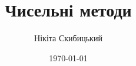 


\title{Чисельні методи}
\author{Нікіта Скибицький}
\date{\today}



\maketitle

\tableofcontents





